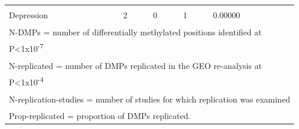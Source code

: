 \documentclass[11pt,twoside]{bristolthesis}
\begin{document}
\begin{table}
{\begin{tabular}[t]{lllll}
\cellcolor{gray!6}{Depression} & \cellcolor{gray!6}{1} & \cellcolor{gray!6}{0} & \cellcolor{gray!6}{1} & \cellcolor{gray!6}{0.00000}\\
Depression & 2 & 0 & 1 & 0.00000\\
\bottomrule
\multicolumn{5}{l}{\textsuperscript{} N-DMPs = number of differentially methylated positions identified at}\\
\multicolumn{5}{l}{P<1x10\textsuperscript{-7}}\\
\multicolumn{5}{l}{\textsuperscript{} N-replicated = number of DMPs replicated in the GEO re-analysis at}\\
\multicolumn{5}{l}{P<1x10\textsuperscript{-4}}\\
\multicolumn{5}{l}{\textsuperscript{} N-replication-studies = number of studies for which replication was examined}\\
\multicolumn{5}{l}{\textsuperscript{} Prop-replicated = proportion of DMPs replicated.}\\
\end{tabular}}
\end{table}
\end{document}
